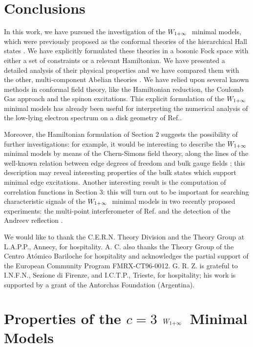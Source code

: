 
\section{Conclusions}

In this work, we have pursued the investigation of the $W_{1+\infty}\ $
minimal models, which were previously proposed as the conformal theories of
the hierarchical Hall states \cite{ctz5}.
We have explicitly formulated these theories in a bosonic
Fock space with either a set of constraints or a relevant Hamiltonian. 
We have presented a detailed analysis of their physical properties 
and we have compared them with the other, multi-component
Abelian theories \cite{abe}.
We have relied upon several known methods in conformal
field theory, like the Hamiltonian reduction, the
Coulomb Gas approach and the spinon excitations.
This explicit formulation of the $W_{1+\infty}\ $ minimal models has already 
been useful for interpreting the numerical analysis of 
the low-lying electron spectrum on a disk geometry of Ref.\cite{cmsz}.

Moreover, the Hamiltonian formulation of Section $2$ 
suggests the possibility of further investigations: 
for example, it would be interesting to describe the $W_{1+\infty}\ $ minimal models 
by means of the Chern-Simons field theory, along the
lines of the well-known relation between edge degrees of freedom
and bulk gauge fields \cite{abe}; this description may reveal 
interesting properties
of the bulk states which support minimal edge excitations.
Another interesting result is the computation of correlation functions
in Section $3$:
this will turn out to be important for searching characteristic signals
of the $W_{1+\infty}\ $ minimal models in two recently proposed experiments:
the multi-point interferometer of Ref.\cite{multi} and the 
detection of the Andreev reflection \cite{andre}.



We would like to thank the C.E.R.N.
Theory Division and the Theory Group at L.A.P.P., Annecy, for hospitality.
A. C. also thanks the Theory Group of the Centro At\'omico 
Bariloche for hospitality and acknowledges the partial
support of the European Community Program FMRX-CT96-0012.
G. R. Z. is grateful to I.N.F.N., Sezione di Firenze,
and I.C.T.P., Trieste, for hospitality; 
his work is supported by a grant of the Antorchas
Foundation (Argentina).


\appendix
\section{Properties of the $c=3$ $W_{1+\infty}\ $ Minimal Models}

